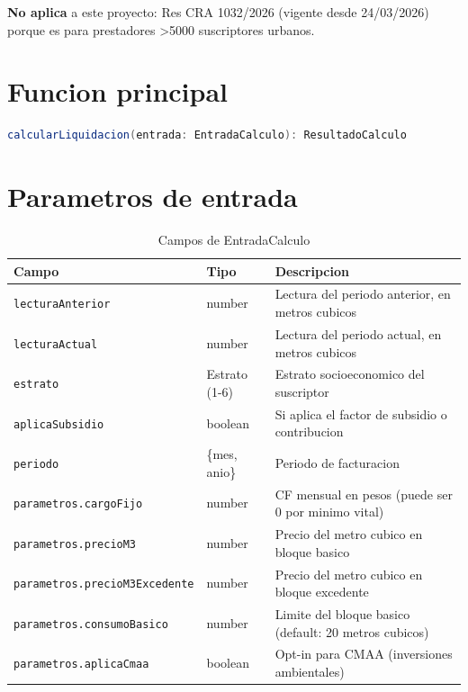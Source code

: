 \documentclass[11pt,a4paper,oneside]{report}
\begin{document}
\textbf{No aplica} a este proyecto: Res CRA 1032/2026 (vigente desde 24/03/2026) porque es para prestadores >5000 suscriptores urbanos.

\section{Funcion principal}

\begin{lstlisting}[language=Java,caption={Interfaz principal del motor},label={lst:motor}]
calcularLiquidacion(entrada: EntradaCalculo): ResultadoCalculo
\end{lstlisting}

\section{Parametros de entrada}

\begin{table}[h]
\centering
\caption{Campos de EntradaCalculo}
\begin{tabularx}{\textwidth}{L{4.5cm} L{2.5cm} X}
\toprule
\textbf{Campo} & \textbf{Tipo} & \textbf{Descripcion} \\
\midrule
\texttt{lecturaAnterior} & number & Lectura del periodo anterior, en metros cubicos \\
\texttt{lecturaActual} & number & Lectura del periodo actual, en metros cubicos \\
\texttt{estrato} & Estrato (1-6) & Estrato socioeconomico del suscriptor \\
\texttt{aplicaSubsidio} & boolean & Si aplica el factor de subsidio o contribucion \\
\texttt{periodo} & \{mes, anio\} & Periodo de facturacion \\
\texttt{parametros.cargoFijo} & number & CF mensual en pesos (puede ser 0 por minimo vital) \\
\texttt{parametros.precioM3} & number & Precio del metro cubico en bloque basico \\
\texttt{parametros.precioM3Excedente} & number & Precio del metro cubico en bloque excedente \\
\texttt{parametros.consumoBasico} & number & Limite del bloque basico (default: 20 metros cubicos) \\
\texttt{parametros.aplicaCmaa} & boolean & Opt-in para CMAA (inversiones ambientales) \\
\bottomrule
\end{tabularx}
\end{table}
\end{document}
